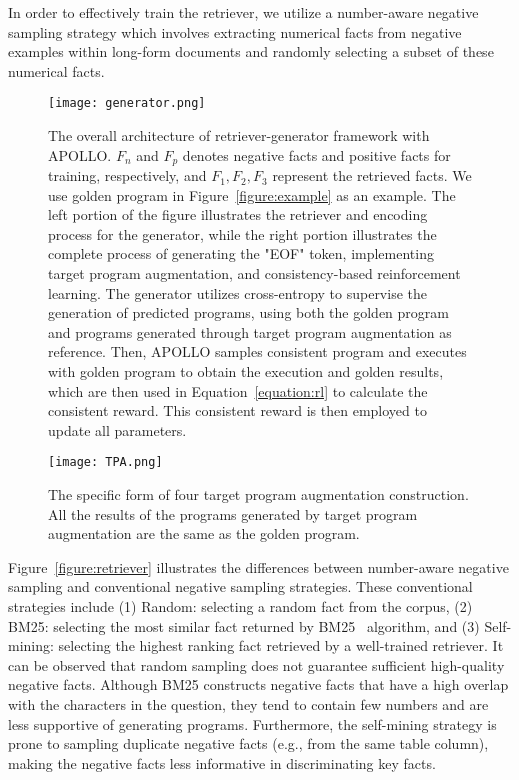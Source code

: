 \documentclass[11pt]{article}
\begin{document}
In order to effectively train the retriever, we utilize a number-aware negative sampling strategy which involves extracting numerical facts from negative examples within long-form documents and randomly selecting a subset of these numerical facts.


\begin{figure*}[t]
\centerline{\texttt{[image: generator.png]}}
    \caption{The overall architecture of retriever-generator framework with APOLLO. $F_n$ and $F_p$ denotes negative facts and positive facts for training, respectively, and $F_1,F_2,F_3$ represent the retrieved facts. We use golden program in Figure~\ref{figure:example} as an example. The left portion of the figure illustrates the retriever and encoding process for the generator, while the right portion illustrates the complete process of generating the "EOF" token, implementing target program augmentation, and consistency-based reinforcement learning. The generator utilizes cross-entropy to supervise the generation of predicted programs, using both the golden program and programs generated through target program augmentation as reference. Then, APOLLO samples consistent program and executes with golden program to obtain the execution and golden results, which are then used in Equation~\ref{equation:rl} to calculate the consistent reward. This consistent reward is then employed to update all parameters.}
    \label{figure:generator}
\end{figure*}

\begin{figure}[t]
\centerline{\texttt{[image: TPA.png]}}
    \caption{The specific form of four target program augmentation construction. All the results of the programs generated by target program augmentation are the same as the golden program.}
    \label{figure:TPA}
\end{figure}


Figure~\ref{figure:retriever} illustrates the differences between number-aware negative sampling and conventional negative sampling strategies. These conventional strategies include (1) Random: selecting a random fact from the corpus, (2) BM25: selecting the most similar fact returned by BM25~\cite{bm25} algorithm, and (3) Self-mining: selecting the highest ranking fact retrieved by a well-trained retriever. It can be observed that random sampling does not guarantee sufficient high-quality negative facts. Although BM25 constructs negative facts that have a high overlap with the characters in the question, they tend to contain few numbers and are less supportive of generating programs. Furthermore, the self-mining strategy is prone to sampling duplicate negative facts (e.g., from the same table column), making the negative facts less informative in discriminating key facts.
\end{document}
